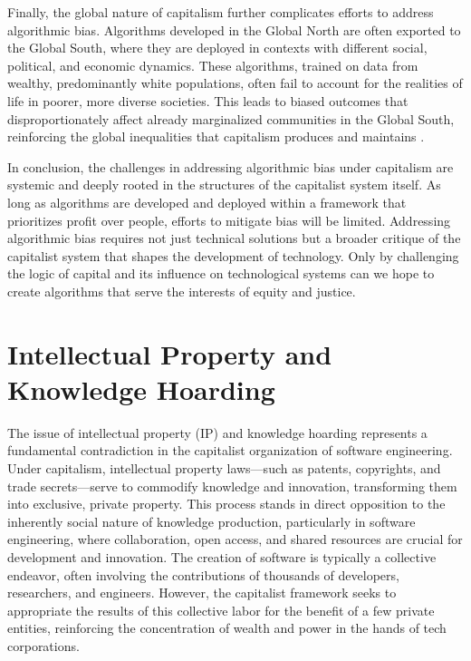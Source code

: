 \begin{refsection}
Finally, the global nature of capitalism further complicates efforts to address algorithmic bias. Algorithms developed in the Global North are often exported to the Global South, where they are deployed in contexts with different social, political, and economic dynamics. These algorithms, trained on data from wealthy, predominantly white populations, often fail to account for the realities of life in poorer, more diverse societies. This leads to biased outcomes that disproportionately affect already marginalized communities in the Global South, reinforcing the global inequalities that capitalism produces and maintains \cite[pp.~28-31]{birhane2021}.

In conclusion, the challenges in addressing algorithmic bias under capitalism are systemic and deeply rooted in the structures of the capitalist system itself. As long as algorithms are developed and deployed within a framework that prioritizes profit over people, efforts to mitigate bias will be limited. Addressing algorithmic bias requires not just technical solutions but a broader critique of the capitalist system that shapes the development of technology. Only by challenging the logic of capital and its influence on technological systems can we hope to create algorithms that serve the interests of equity and justice.

\section{Intellectual Property and Knowledge Hoarding}

The issue of intellectual property (IP) and knowledge hoarding represents a fundamental contradiction in the capitalist organization of software engineering. Under capitalism, intellectual property laws—such as patents, copyrights, and trade secrets—serve to commodify knowledge and innovation, transforming them into exclusive, private property. This process stands in direct opposition to the inherently social nature of knowledge production, particularly in software engineering, where collaboration, open access, and shared resources are crucial for development and innovation. The creation of software is typically a collective endeavor, often involving the contributions of thousands of developers, researchers, and engineers. However, the capitalist framework seeks to appropriate the results of this collective labor for the benefit of a few private entities, reinforcing the concentration of wealth and power in the hands of tech corporations.


\end{refsection}
